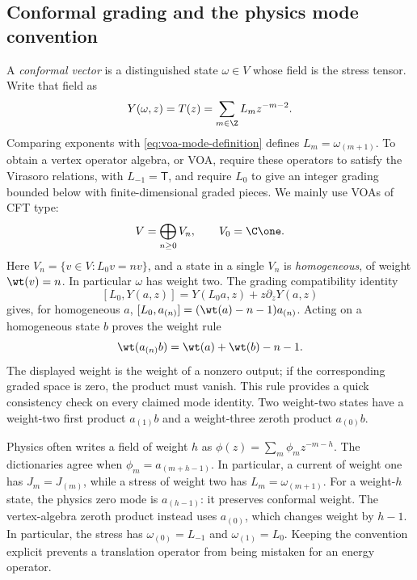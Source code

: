 \subsection{Conformal grading and the physics mode convention}

A \emph{conformal vector} is a distinguished state $\omega\in V$
whose field is the stress tensor. Write that field as
\[
 Y(\omega,z)=T(z)=\sum_{m\in\Z}L_mz^{-m-2}.
\]
Comparing exponents with \eqref{eq:voa-mode-definition} defines
$L_m=\omega_{(m+1)}$. To obtain a vertex operator algebra, or
VOA, require these operators to satisfy the Virasoro relations,
with $L_{-1}=\mathsf T$, and require $L_0$ to give an integer
grading bounded below with finite-dimensional graded pieces.
We mainly use VOAs of CFT type:
\[
 V=\bigoplus_{n\ge0}V_n,\qquad V_0=\C\one.
\]
Here $V_n=\{v\in V:L_0v=nv\}$, and a state in a single $V_n$
is \emph{homogeneous}, of weight $\wt(v)=n$. In particular
$\omega$ has weight two. The grading compatibility identity
\[
 [L_0,Y(a,z)]=Y(L_0a,z)+z\partial_zY(a,z)
\]
gives, for homogeneous $a$,
$[L_0,a_{(n)}]=(\wt(a)-n-1)a_{(n)}$.
Acting on a homogeneous state $b$ proves the weight rule
\begin{equation}
 \wt(a_{(n)}b)=\wt(a)+\wt(b)-n-1.
 \label{eq:voa-mode-weight}
\end{equation}
The displayed weight is the weight of a nonzero output; if the
corresponding graded space is zero, the product must vanish.
This rule provides a quick consistency check on every claimed mode
identity. Two weight-two states have a weight-two first product
$a_{(1)}b$ and a weight-three zeroth product $a_{(0)}b$.

Physics often writes a field of weight $h$ as
$\phi(z)=\sum_m\phi_m z^{-m-h}$. The dictionaries agree when
$\phi_m=a_{(m+h-1)}$. In particular, a current of weight one has
$J_m=J_{(m)}$, while a stress of weight two has
$L_m=\omega_{(m+1)}$. For a weight-$h$ state, the physics zero
mode is $a_{(h-1)}$: it preserves conformal weight. The
vertex-algebra zeroth product instead uses $a_{(0)}$, which
changes weight by $h-1$. In particular, the stress has
$\omega_{(0)}=L_{-1}$ and $\omega_{(1)}=L_0$.
Keeping the convention explicit prevents a translation operator
from being mistaken for an energy operator.


